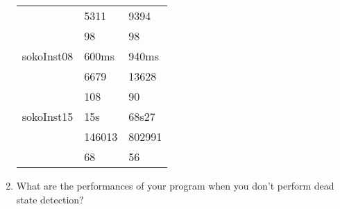 \begin{enumerate}
\begin{framed}
\begin{tabular}{l|l|l}
    					& 5311		& 9394 \\
    					& 98		& 98 \\
    		sokoInst08 	& 600ms		& 940ms \\
    					& 6679		& 13628 \\
    					& 108		& 90 \\
    		sokoInst15 	& 15s		& 68s27 \\
    					& 146013 	& 802991 \\
    					& 68		& 56 \\
    	\end{tabular}
    \end{framed}
  \item What are the performances of your program when you don’t perform dead state
detection?
    \begin{framed}
    \end{framed}
\end{enumerate}
